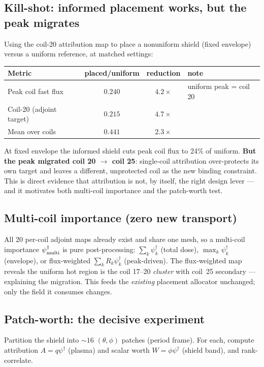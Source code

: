 \documentclass[11pt]{article}
\newcommand{\psid}{\psi^{\dagger}}
\begin{document}
\subsection{Kill-shot: informed placement works, but the peak migrates}
Using the coil-20 attribution map to place a nonuniform shield (fixed envelope) versus a uniform
reference, at matched settings:
\begin{center}
\begin{tabular}{lccl}
\toprule
Metric & placed/uniform & reduction & note \\
\midrule
Peak coil fast flux & $0.240$ & $\mathbf{4.2\times}$ & uniform peak = coil 20 \\
Coil-20 (adjoint target) & $0.215$ & $4.7\times$ & \\
Mean over coils & $0.441$ & $2.3\times$ & \\
\bottomrule
\end{tabular}
\end{center}
At fixed envelope the informed shield cuts peak coil flux to 24\% of uniform. \textbf{But the
peak migrated coil 20 $\to$ coil 25}: single-coil attribution over-protects its own target and
leaves a different, unprotected coil as the new binding constraint. This is direct evidence that
attribution is not, by itself, the right design lever --- and it motivates both multi-coil
importance and the patch-worth test.

\subsection{Multi-coil importance (zero new transport)}
All 20 per-coil adjoint maps already exist and share one mesh, so a multi-coil importance
$\psid_{\rm multi}$ is pure post-processing: $\sum_k \psid_k$ (total dose), $\max_k \psid_k$
(envelope), or flux-weighted $\sum_k R_k\psid_k$ (peak-driven). The flux-weighted map reveals the
uniform hot region is the coil 17--20 \emph{cluster} with coil~25 secondary --- explaining the
migration. This feeds the \emph{existing} placement allocator unchanged; only the field it
consumes changes.

\subsection{Patch-worth: the decisive experiment}
Partition the shield into $\sim16$ $(\theta,\phi)$ patches (period frame). For each, compute
attribution $A=q\psid$ (plasma) and scalar worth $W=\phi\psid$ (shield band), and rank-correlate.
\end{document}
